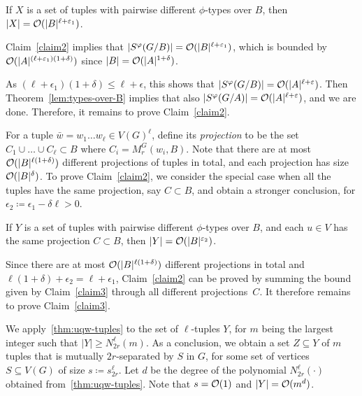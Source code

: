 \begin{claim}\label{claim2}
If $X$ is a set of tuples with pairwise different $\phi$-types over $B$, then $|X|=\mathcal{O}(|B|^{\ell+\varepsilon_1})$.
\end{claim}	

Claim~\ref{claim2} implies that $|S^\varphi(G/B)|=\mathcal{O}(|B|^{\ell+\varepsilon_1})$, 
which is bounded by $\mathcal{O}(|A|^{(\ell+\varepsilon_1)(1+\delta)})$ since $|B|=\mathcal{O}(|A|^{1+\delta})$. 

As $(\ell+\epsilon_1)(1+\delta)\le \ell+\epsilon$, this shows that $|S^\varphi(G/B)|=\mathcal{O}(|A|^{\ell+\varepsilon})$.
Then Theorem~\ref{lem:types-over-B} implies that also $|S^\varphi(G/A)|=\mathcal{O}(|A|^{\ell+\varepsilon})$, and we are done. Therefore, it remains to prove Claim~\ref{claim2}.

\medskip

For a tuple $\bar w=w_1\ldots w_\ell\in V(G)^\ell$, define its \emph{projection}
to be the set $C_1\cup\ldots\cup C_\ell\subset B$ where  
$C_i=M^G_r(w_i, B)$. Note that there are at most 
$\mathcal{O}(|B|^{\ell(1+\delta)})$ different projections of tuples in total, and each projection has size $\mathcal{O}(|B|^\delta)$.
To prove Claim~\ref{claim2}, we consider the special case when all the tuples have the same projection, say $C\subset B$, and  obtain a stronger conclusion,
for $\epsilon_2\coloneqq \epsilon_1-\delta\ell>0$.

\begin{claim}\label{claim3}
If $Y$ is a set of tuples with pairwise different $\phi$-types over $B$, and each $u\in V$ has the same projection $C\subset B$, then $|Y|=\mathcal{O}(|B|^{\varepsilon_2})$.
\end{claim}

Since there are at most $\mathcal{O}(|B|^{\ell(1+\delta)})$ different projections in total and $\ell(1+\delta)+\epsilon_2=\ell+\epsilon_1$, Claim~\ref{claim2} can be proved
by summing the bound given by Claim~\ref{claim3} through all different projections~$C$.
It therefore remains to prove Claim~\ref{claim3}.

\medskip

We apply~\autoref{thm:uqw-tuples} to the set of $\ell$-tuples $Y$, for $m$ being the largest integer such that $|Y|\ge N^{\ell}_{2r}(m)$.
  As a conclusion, we obtain a set $Z\subseteq Y$ of $m$ tuples that is mutually $2r$-separated by $S$ in $G$, for some set of vertices $S\subseteq V(G)$ of size $s\coloneqq s^{\ell}_{2r}$.
  Let $d$ be the degree of the polynomial $N^\ell_{2r}(\cdot)$ obtained from~\autoref{thm:uqw-tuples}.
  Note that $s=\mathcal{O}(1)$ and $|Y|=\mathcal{O}(m^d)$.
    
